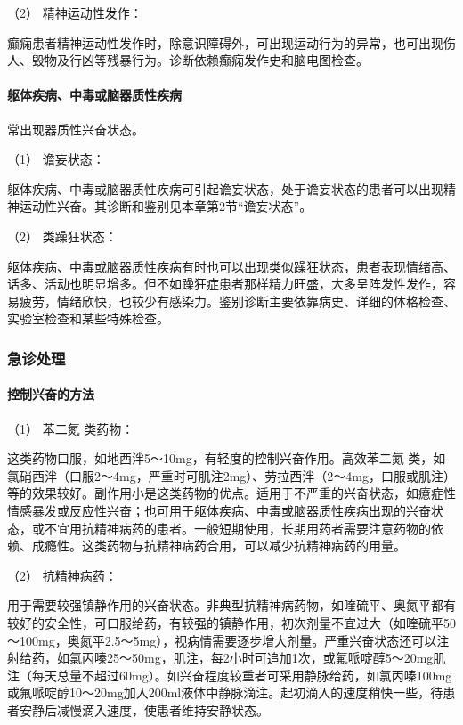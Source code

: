 \hypertarget{text00043.htmlux5cux23CHP1-18-1-2-7-2}{}
（2） 精神运动性发作：

癫痫患者精神运动性发作时，除意识障碍外，可出现运动行为的异常，也可出现伤人、毁物及行凶等残暴行为。诊断依赖癫痫发作史和脑电图检查。

\paragraph{躯体疾病、中毒或脑器质性疾病}

常出现器质性兴奋状态。

\hypertarget{text00043.htmlux5cux23CHP1-18-1-2-8-1}{}
（1） 谵妄状态：

躯体疾病、中毒或脑器质性疾病可引起谵妄状态，处于谵妄状态的患者可以出现精神运动性兴奋。其诊断和鉴别见本章第2节“谵妄状态”。

\hypertarget{text00043.htmlux5cux23CHP1-18-1-2-8-2}{}
（2） 类躁狂状态：

躯体疾病、中毒或脑器质性疾病有时也可以出现类似躁狂状态，患者表现情绪高、话多、活动也明显增多。但不如躁狂症患者那样精力旺盛，大多呈阵发性发作，容易疲劳，情绪欣快，也较少有感染力。鉴别诊断主要依靠病史、详细的体格检查、实验室检查和某些特殊检查。

\subsubsection{急诊处理}

\paragraph{控制兴奋的方法}

\hypertarget{text00043.htmlux5cux23CHP1-18-1-3-1-1}{}
（1） 苯二氮{} 类药物：

这类药物口服，如地西泮5～10mg，有轻度的控制兴奋作用。高效苯二氮{}
类，如氯硝西泮（口服2～4mg，严重时可肌注2mg）、劳拉西泮（2～4mg，口服或肌注）等的效果较好。副作用小是这类药物的优点。适用于不严重的兴奋状态，如癔症性情感暴发或反应性兴奋；也可用于躯体疾病、中毒或脑器质性疾病出现的兴奋状态，或不宜用抗精神病药的患者。一般短期使用，长期用药者需要注意药物的依赖、成瘾性。这类药物与抗精神病药合用，可以减少抗精神病药的用量。

\hypertarget{text00043.htmlux5cux23CHP1-18-1-3-1-2}{}
（2） 抗精神病药：

用于需要较强镇静作用的兴奋状态。非典型抗精神病药物，如喹硫平、奥氮平都有较好的安全性，可口服给药，有较强的镇静作用，初次剂量不宜过大（如喹硫平50～100mg，奥氮平2.5～5mg），视病情需要逐步增大剂量。严重兴奋状态还可以注射给药，如氯丙嗪25～50mg，肌注，每2小时可追加1次，或氟哌啶醇5～20mg肌注（每天总量不超过60mg）。如兴奋程度较重者可采用静脉给药，如氯丙嗪100mg或氟哌啶醇10～20mg加入200ml液体中静脉滴注。起初滴入的速度稍快一些，待患者安静后减慢滴入速度，使患者维持安静状态。

